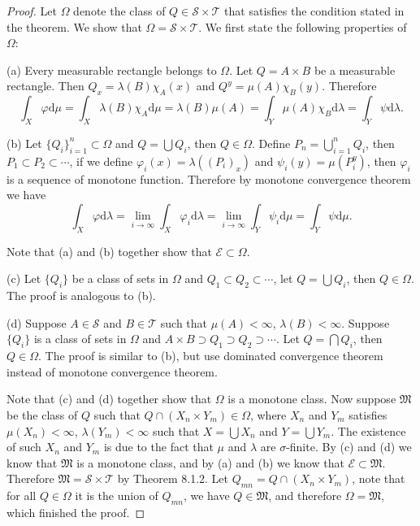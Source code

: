 \begin{proof}
Let $\Omega$ denote the class of $Q\in\mathscr{S}\times\mathscr{T}$ that satisfies the condition stated in the theorem. We show that $\Omega=\mathscr{S}\times\mathscr{T}$. We first state the following properties of $\Omega$:\par
(a) Every measurable rectangle belongs to $\Omega$. Let $Q=A\times B$ be a measurable rectangle. Then $Q_x=\lambda(B)\chi_A(x)$ and $Q^y=\mu(A)\chi_B(y)$. Therefore 
$$
\int_X{\varphi \mathrm{d}\mu}=\int_X{\lambda \left( B \right) \chi _A\mathrm{d}\mu}=\lambda \left( B \right) \mu \left( A \right) =\int_Y{\mu \left( A \right) \chi _B\mathrm{d}\lambda}=\int_Y{\psi \mathrm{d}\lambda}.
$$\par
(b) Let $\{Q_i\}_{i=1}^n\subset\Omega$ and $Q=\bigcup Q_i$, then $Q\in\Omega$. Define $P_n=\bigcup_{i=1}^nQ_i$, then $P_1\subset P_2\subset\cdots$, if we define $\varphi_i(x)=\lambda((P_i)_x)$ and $\psi_i(y)=\mu(P_i^y)$, then $\varphi_i$ is a sequence of monotone function. Therefore by monotone convergence theorem we have 
$$
\int_X{\varphi \mathrm{d}\lambda}=\lim_{i\rightarrow \infty} \int_X{\varphi _i\mathrm{d}\lambda}=\lim_{i\rightarrow \infty} \int_Y{\psi _i\mathrm{d}\mu}=\int_Y{\psi \mathrm{d}\mu}.
$$\par
Note that (a) and (b) together show that $\mathscr{E}\subset\Omega$.\par
(c) Let $\{Q_i\}$ be a class of sets in $\Omega$ and $Q_1\subset Q_2\subset\cdots$, let $Q=\bigcup Q_i$, then $Q\in\Omega$. The proof is analogous to (b).\par
(d) Suppose $A\in\mathscr{S}$ and $B\in\mathscr{T}$ such that $\mu(A)<\infty$, $\lambda(B)<\infty$. Suppose $\{Q_i\}$ is a class of sets in $\Omega$ and $A\times B\supset Q_1\supset Q_2\supset\cdots$. Let $Q=\bigcap Q_i$, then $Q\in\Omega$. The proof is similar to (b), but use dominated convergence theorem instead of monotone convergence theorem.\par
Note that (c) and (d) together show that $\Omega$ is a monotone class. Now suppose $\mathfrak{M}$ be the class of $Q$ such that $Q\cap(X_n\times Y_m)\in\Omega$, where $X_n$ and $Y_m$ satisfies $\mu(X_n)<\infty$, $\lambda(Y_m)<\infty$ such that $X=\bigcup X_n$ and $Y=\bigcup Y_m$. The existence of such $X_n$ and $Y_m$ is due to the fact that $\mu$ and $\lambda$ are $\sigma$-finite. By (c) and (d) we know that $\mathfrak{M}$ is a monotone class, and by (a) and (b) we know that $\mathscr{E}\subset\mathfrak{M}$. Therefore $\mathfrak{M}=\mathscr{S}\times\mathscr{T}$ by Theorem 8.1.2. Let $Q_{mn}=Q\cap(X_n\times Y_m)$, note that for all $Q\in\Omega$ it is the union of $Q_{mn}$, we have $Q\in\mathfrak{M}$, and therefore $\Omega=\mathfrak{M}$, which finished the proof.
\end{proof}
